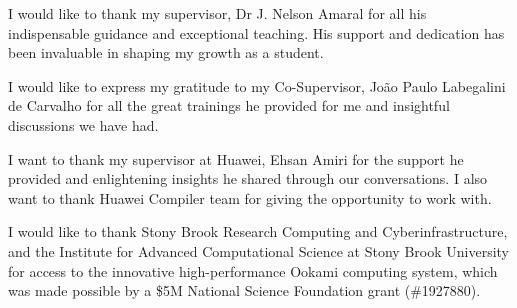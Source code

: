 \begin{acknowledgements}  

\setlength{\baselineskip}{1.6\baselineskip} 

I would like to thank my supervisor, Dr J. Nelson Amaral for all his indispensable guidance and exceptional teaching. His support and dedication has been invaluable in shaping  my growth as a student.

I would like to express my gratitude to my Co-Supervisor, João Paulo Labegalini de Carvalho for all the great trainings he provided for me and insightful discussions we have had.

I want to thank my supervisor at Huawei, Ehsan Amiri for the support he provided and enlightening insights he shared through our conversations. I also want to thank Huawei Compiler team for giving the opportunity to work with.

I would like to thank Stony Brook Research Computing and Cyberinfrastructure, and the Institute for Advanced Computational Science at Stony Brook University for access to the innovative high-performance Ookami computing system, which was made possible by a \$5M National Science Foundation grant (\#1927880).
\end{acknowledgements}